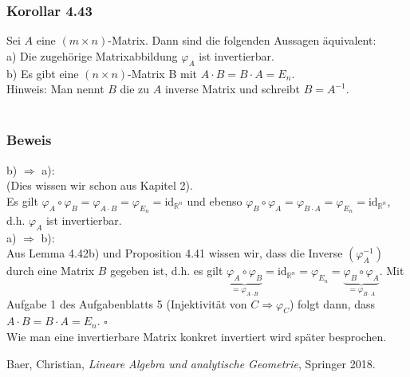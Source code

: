 \documentclass{article}
\begin{document}
\subsubsection*{Korollar 4.43}
Sei $A$ eine $(m \times n)$-Matrix. Dann sind die folgenden Aussagen äquivalent: \\
a) Die zugehörige Matrixabbildung $\varphi_A$ ist invertierbar. \\
b) Es gibt eine $(n \times n)$-Matrix B mit $A \cdot B = B \cdot A = E_n$. \\
Hinweis: Man nennt $B$ die zu $A$ inverse Matrix und schreibt $B = A^{-1}$. \\
\\
\subsubsection*{Beweis}
b) $\Rightarrow$ a): \\
(Dies wissen wir schon aus Kapitel 2).\\
Es gilt $\varphi_A \circ \varphi_B = \varphi_{A \cdot B} = \varphi_{E_n} = \text{id}_{\mathbb{R}^n}$ und ebenso $\varphi_B \circ \varphi_A = \varphi_{B \cdot A} = \varphi_{E_n} = \text{id}_{\mathbb{R}^n}$, d.h. $\varphi_A$ ist invertierbar. \\
a) $\Rightarrow$ b): \\
Aus Lemma 4.42b) und Proposition 4.41 wissen wir, dass die Inverse $(\varphi_A^{-1})$ durch eine Matrix $B$ gegeben ist, d.h. es gilt $\underbrace{\varphi_A \circ \varphi_B}_{=\varphi_{A \cdot B}} = \text{id}_{\mathbb{R}^n} = \varphi_{E_n} = \underbrace{\varphi_B \circ \varphi_A}_{=\varphi_{B \cdot A}}$.
Mit Aufgabe 1 des Aufgabenblatts 5 (Injektivität von $C \Rightarrow \varphi_C$) folgt dann, dass $A \cdot B = B \cdot A = E_n$. $\square$ \\
Wie man eine invertierbare Matrix konkret invertiert wird später besprochen.

\newpage
\begin{thebibliography}{9}
    Baer, Christian,
    \emph{Lineare Algebra und analytische Geometrie},
    Springer 2018.
    \end{thebibliography}
\end{document}
